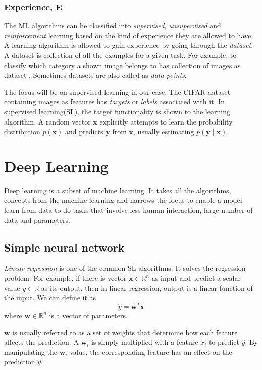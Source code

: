 \subsubsection*{Experience, E}
The ML algorithms can be classified into \textit{supervised}, \textit{unsupervised} and
\textit{reinforcement} learning based on the kind of experience they are allowed to have.
A learning algorithm is allowed to gain experience by going through the \textit{dataset}.
A dataset is collection of all the examples for a given task. For example, to classify
which category a shown image belongs to has collection of images as dataset
\cite{cifar10}. Sometimes datasets are also called as \textit{data points}.

The focus will be on supervised learning in our case. The CIFAR
dataset \cite{cifar10} containing images as features has \textit{targets} or
\textit{labels} associated with it. In supervised learning(SL), the target functionality
is shown to the learning algorithm. A random vector $\mathbf{x}$ explicitly attempts to
learn the probability distribution $p(\mathbf{x})$ and predicts $\mathbf{y}$ from
$\mathbf{x}$, usually estimating $p(\mathbf{y}\mid\mathbf{x})$.

\section{Deep Learning}
Deep learning is a subset of machine learning. It takes all the algorithms, concepts from
the machine learning and narrows the focus to enable a model learn from data to do tasks
that involve less human interaction, large number of data and parameters.

\subsection{Simple neural network}
\textit{Linear regression} is one of the common SL algorithms. It solves the regression
problem. For example, if there is vector $\mathbf{x} \in \mathbb{R}^n$ as input and
predict a scalar value $y \in \mathbb{R}$ as its output, then in linear regression, output
is a linear function of the input. We can define it as
\begin{equation}
    \hat y = \mathbf{w}^T\mathbf{x}
\end{equation}
where $\mathbf{w} \in \mathbb{R}^n$ is a vector of parameters.

$\mathbf{w}$ is usually referred to as a set of weights that determine how each feature
affects the prediction. A $\mathbf{w}_i$ is simply multiplied with a feature $x_i$ to
predict $\hat y$. By manipulating the $\mathbf{w}_i$ value, the corresponding feature has
an effect on the prediction  $\hat y$.

